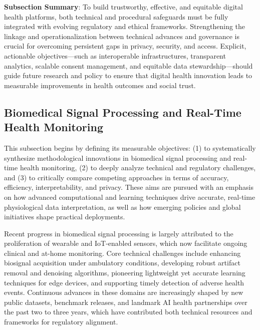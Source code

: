 \documentclass[sigconf]{acmart}
\begin{document}
\vspace{0.5em}
\noindent\textbf{Subsection Summary}: To build trustworthy, effective, and equitable digital health platforms, both technical and procedural safeguards must be fully integrated with evolving regulatory and ethical frameworks. Strengthening the linkage and operationalization between technical advances and governance is crucial for overcoming persistent gaps in privacy, security, and access. Explicit, actionable objectives—such as interoperable infrastructures, transparent analytics, scalable consent management, and equitable data stewardship—should guide future research and policy to ensure that digital health innovation leads to measurable improvements in health outcomes and social trust.

\subsection{Biomedical Signal Processing and Real-Time Health Monitoring}

This subsection begins by defining its measurable objectives: (1) to systematically synthesize methodological innovations in biomedical signal processing and real-time health monitoring, (2) to deeply analyze technical and regulatory challenges, and (3) to critically compare competing approaches in terms of accuracy, efficiency, interpretability, and privacy. These aims are pursued with an emphasis on how advanced computational and learning techniques drive accurate, real-time physiological data interpretation, as well as how emerging policies and global initiatives shape practical deployments.

Recent progress in biomedical signal processing is largely attributed to the proliferation of wearable and IoT-enabled sensors, which now facilitate ongoing clinical and at-home monitoring. Core technical challenges include enhancing biosignal acquisition under ambulatory conditions, developing robust artifact removal and denoising algorithms, pioneering lightweight yet accurate learning techniques for edge devices, and supporting timely detection of adverse health events. Continuous advances in these domains are increasingly shaped by new public datasets, benchmark releases, and landmark AI health partnerships over the past two to three years, which have contributed both technical resources and frameworks for regulatory alignment.
\end{document}
